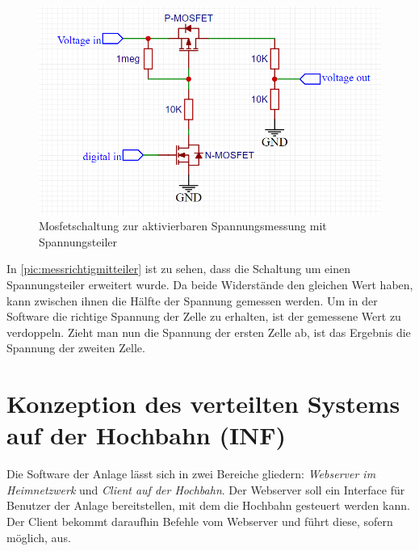 \begin{figure}[h]
	\begin{center}
		\includegraphics[width=13cm]{messMitTeiler.PNG}
		\caption{\label{pic:messrichtigmitteiler} Mosfetschaltung zur aktivierbaren Spannungsmessung mit Spannungsteiler}
	\end{center}
\end{figure}

In \autoref{pic:messrichtigmitteiler} ist zu sehen, dass die Schaltung um einen Spannungsteiler erweitert wurde. Da beide Widerstände den gleichen Wert haben, kann zwischen ihnen die Hälfte der Spannung gemessen werden. 
Um in der Software die richtige Spannung der Zelle zu erhalten, ist der gemessene Wert zu verdoppeln. Zieht man nun die Spannung der ersten Zelle ab, ist das Ergebnis die Spannung der zweiten Zelle.

\chapter{Konzeption des verteilten Systems auf der Hochbahn (INF)}
\label{sec:software}
Die Software der Anlage lässt sich in zwei Bereiche gliedern: \textit{Webserver im Heimnetzwerk} und \textit{Client auf der Hochbahn}. Der Webserver soll ein Interface für Benutzer der Anlage bereitstellen, mit dem die Hochbahn gesteuert werden kann. 
Der Client bekommt daraufhin Befehle vom Webserver und führt diese, sofern möglich, aus. 

